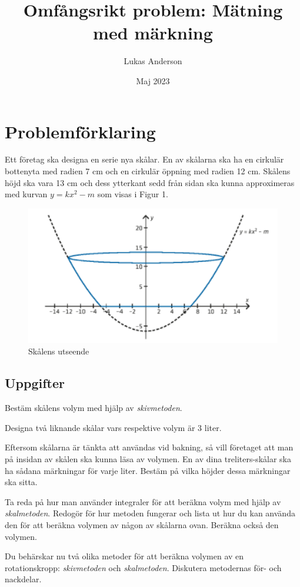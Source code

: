 \documentclass[12pt]{article}
\title{Omfångsrikt problem: Mätning med märkning}
\author{Lukas Anderson}
\date{Maj 2023}
\begin{document}
\maketitle

\section*{Problemförklaring}
Ett företag ska designa en serie nya skålar. En av skålarna ska ha en cirkulär bottenyta med radien 7 cm och en cirkulär öppning med radien 12 cm. Skålens höjd ska vara 13 cm och dess ytterkant sedd från sidan ska kunna approximeras med kurvan $y=kx^2-m$ som visas i Figur 1.
\begin{figure}[h]
    \centering
    \includegraphics[width=\textwidth]{figur1.png}
    \caption{Skålens utseende}
\end{figure}
\subsection*{Uppgifter}
\begin{list}{-}{\leftmargin=1em\rightmargin=1em}
    \item Bestäm skålens volym med hjälp av {\it skivmetoden}.
    \item Designa två liknande skålar vars respektive volym är 3 liter.
    \item Eftersom skålarna är tänkta att användas vid bakning, så vill företaget att man på insidan av skålen ska kunna läsa av volymen. En av dina treliters-skålar ska ha sådana märkningar för varje liter. Bestäm på vilka höjder dessa märkningar ska sitta.
    \item Ta reda på hur man använder integraler för att beräkna volym med hjälp av {\it skalmetoden}. Redogör för hur metoden fungerar och lista ut hur du kan använda den för att beräkna volymen av någon av skålarna ovan. Beräkna också den volymen.
    \item Du behärskar nu två olika metoder för att beräkna volymen av en rotationskropp: {\it skivmetoden\/} och {\it skalmetoden}. Diskutera metodernas för- och nackdelar.
\end{list}
\end{document}
